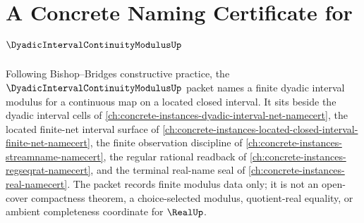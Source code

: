 \chapter{A Concrete Naming Certificate for $\DyadicIntervalContinuityModulusUp$}
\label{ch:concrete-instances-dyadic-interval-continuity-modulus-namecert}

Following Bishop--Bridges constructive practice, the $\DyadicIntervalContinuityModulusUp$ packet names a finite dyadic interval modulus for a continuous map on a located closed interval. It sits beside the dyadic interval cells of \autoref{ch:concrete-instances-dyadic-interval-net-namecert}, the located finite-net interval surface of \autoref{ch:concrete-instances-located-closed-interval-finite-net-namecert}, the finite observation discipline of \autoref{ch:concrete-instances-streamname-namecert}, the regular rational readback of \autoref{ch:concrete-instances-regseqrat-namecert}, and the terminal real-name seal of \autoref{ch:concrete-instances-real-namecert}. The packet records finite modulus data only; it is not an open-cover compactness theorem, a choice-selected modulus, quotient-real equality, or ambient completeness coordinate for $\RealUp$.

